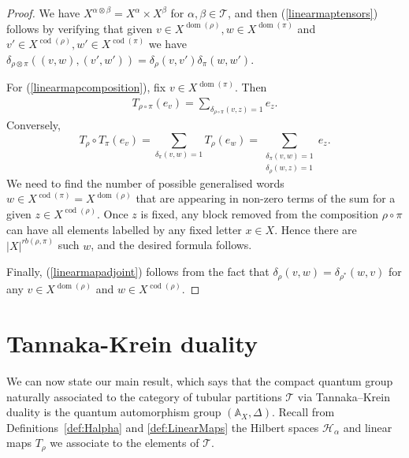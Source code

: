 \documentclass[12pt, a4paper]{amsart}
\def\Hom{\operatorname{Hom}}
\def\spn{\operatorname{span}}
\def\dom{\operatorname{dom}}
\def\cod{\operatorname{cod}}
\def\A{\mathbb{A}}
\def\BB{\mathcal{B}}
\def\HH{\mathcal{H}}
\def\RR{\mathcal{R}}
\def\TT{\mathcal{T}}
\theoremstyle{definition}
\newtheorem{definition}[thm]{Definition}
\theoremstyle{remark}
\newtheorem{remark}[thm]{Remark}
\numberwithin{equation}{section}
\begin{document}
\begin{proof}
We have $X^{\alpha\otimes\beta} = X^\alpha \times X^\beta$ for $\alpha,\beta\in \TT$, and then (\ref{linearmaptensors}) follows by verifying that given $v\in X^{\dom(\rho)}, w\in X^{\dom(\pi)}$ and $v'\in X^{\cod(\rho)}, w'\in X^{\cod(\pi)}$ we have $\delta_{\rho\otimes\pi}((v,w),(v',w')) = \delta_\rho(v,v') \delta_\pi(w,w')$.

For (\ref{linearmapcomposition}), fix $v\in X^{\dom(\pi)}$. Then
\begin{align*}
 T_{\rho\circ\pi}(e_v) = \sum_{\delta_{\rho\circ\pi}(v,z)=1} e_z.
\end{align*}
Conversely,
\[
 T_\rho\circ T_\pi(e_v) = \sum_{\delta_\pi(v,w)=1} T_\rho(e_w)= \sum_{\substack{\delta_\pi(v,w)=1 \\ \delta_\rho(w,z)=1}} e_z.
\]
We need to find the number of possible generalised words $w \in X^{\cod(\pi)} = X^{\dom(\rho)}$ that are appearing in non-zero terms of the sum for a given $z\in X^{\cod(\rho)}$. Once $z$ is fixed, any block removed from the composition $\rho\circ\pi$ can have all elements labelled by any fixed letter $x\in X$. Hence there are $|X|^{rb(\rho,\pi)}$ such $w$, and the desired formula follows.

Finally, (\ref{linearmapadjoint}) follows from the fact that $\delta_\rho(v,w) = \delta_{\rho^*}(w,v)$ for any $v\in X^{\dom(\rho)}$ and $w \in X^{\cod(\rho)}$.
\end{proof}




\section{Tannaka-Krein duality} \label{sec:tkduality}

We can now state our main result, which says that the compact quantum group naturally associated to the category of tubular partitions $\TT$ via Tannaka--Krein duality is the quantum automorphism group $(\A_X,\Delta)$. Recall from Definitions~\ref{def:Halpha} and \ref{def:LinearMaps} the Hilbert spaces $\HH_\alpha$ and linear maps $T_\rho$ we associate to the elements of $\TT$. 

%
%
%
\end{document}
